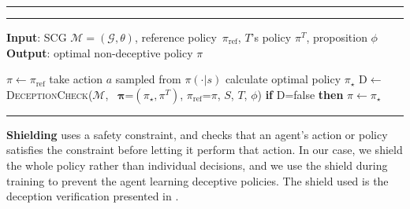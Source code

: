 \documentclass[submission,publicdomain,creativecommons noncommercial]{eptcs}
\begin{document}
\begin{table}
\vspace{-2mm}
\hrule
{} \vspace{-3mm}
\hrule
 \textbf{Input}: SCG $\mathcal{M}=(\mathcal G, \theta)$, reference policy~$\pi_\mathrm{ref}$, $T$'s policy $\pi^T$, proposition $\phi$ %
 \\
\textbf{Output}: optimal non-deceptive policy $\pi$
\begin{algorithmic}[1] %
\STATE $\pi\leftarrow\pi_\mathrm{ref}$
\STATE take action $a$ sampled from $\pi(\cdot|s)$
\STATE calculate optimal policy $\pi_\star$
\STATE D$\leftarrow$\textsc{DeceptionCheck}($\mathcal{M}$, ~$\bm{\pi}$=$ (\pi_\star, \pi^T)$, $\pi_\mathrm{ref}$=$\pi$, $S$, $T$, $\phi$)
\STATE \textbf{if} D=false \textbf{then} $\pi\leftarrow\pi_\star$
\ENDFOR
\end{algorithmic}
\hrule
\vspace{-4mm}
\end{table}

\textbf{Shielding }
 uses a safety constraint, and checks that an agent's action or policy satisfies the constraint before letting it perform that action. In our case, we shield the whole policy rather than individual decisions, and we use the shield during training to prevent the agent learning deceptive policies. The shield used is  the deception verification %
presented in .
\end{document}
